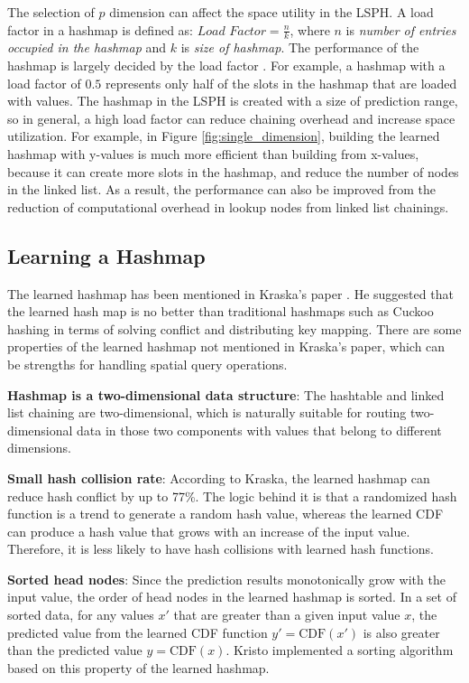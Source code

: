  The selection of $p$ dimension can affect the space utility in the LSPH. A load factor in a hashmap is defined as: $\textit{Load Factor} = \frac{\textit{n}}{\textit{k}} $, where $n$ is \textit{number of entries occupied in the hashmap} and $k$ is \textit{size of hashmap}. The performance of the hashmap is largely decided by the load factor \cite{hashmap}. For example, a hashmap with a load factor of $0.5$ represents only half of the slots in the hashmap that are loaded with values. The hashmap in the LSPH is created with a size of prediction range, so in general, a high load factor can reduce chaining overhead and increase space utilization. For example, in Figure \ref{fig:single_dimension}, building the learned hashmap with y-values is much more efficient than building from x-values, because it can create more slots in the hashmap, and reduce the number of nodes in the linked list. As a result, the performance can also be improved from the reduction of computational overhead in lookup nodes from linked list chainings. 



\subsection{Learning a Hashmap} \label{the_learned_hashmap}


The learned hashmap has been mentioned in Kraska’s paper \cite{Kafle:2017dy}. He suggested that the learned hash map is no better than traditional hashmaps such as Cuckoo hashing in terms of solving conflict and distributing key mapping. There are some properties of the learned hashmap not mentioned in Kraska's paper, which can be strengths for handling spatial query operations. 

\textbf{Hashmap is a two-dimensional data structure}:
The hashtable and linked list chaining are two-dimensional, which is naturally suitable for routing two-dimensional data in those two components with values that belong to different dimensions. 


\textbf{Small hash collision rate}: According to Kraska, the learned hashmap can reduce hash conflict by up to 77\%. The logic behind it is that a randomized hash function is a trend to generate a random hash value, whereas the learned CDF can produce a hash value that grows with an increase of the input value. Therefore, it is less likely to have hash collisions with learned hash functions.

\textbf{Sorted head nodes}: Since the prediction results monotonically grow with the input value, the order of head nodes in the learned hashmap is sorted. In a set of sorted data, for any values $x\prime$ that are greater than a given input value $x$, the predicted value from the learned CDF function $y\prime = \text{CDF}(x\prime)$ is also greater than the predicted value $y = \text{CDF}(x)$. Kristo \cite{Kristo:2020it} implemented a sorting algorithm based on this property of the learned hashmap. 


